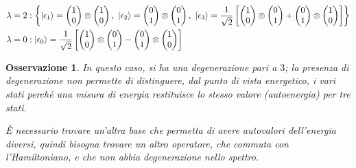 \documentclass[11pt, a4paper]{scrartcl} %
\numberwithin{equation}{subsection}
\theoremstyle{style2}
\newtheorem{osservazione}{Osservazione}[section]
\theoremstyle{style1}
\newenvironment{boxenv}[1][]{
    \begin{eqbox}[#1]
    }{
   \end{eqbox}
}
\begin{document}
\begin{equation}\label{auten1}
\begin{split}
	\lambda = 2&: \left\{\ket{\epsilon _1} = \begin{pmatrix} 1\\0\end{pmatrix} \otimes \begin{pmatrix} 1\\0 \end{pmatrix} ,\  \ket{\epsilon _2}= \begin{pmatrix} 0\\1 \end{pmatrix} \otimes \begin{pmatrix} 0\\1 \end{pmatrix} , \ \ket{\epsilon _3} = \frac{1}{\sqrt{2} }\left[ \begin{pmatrix} 1\\0 \end{pmatrix} \otimes \begin{pmatrix} 0\\1 \end{pmatrix} + \begin{pmatrix} 0\\1 \end{pmatrix} \otimes \begin{pmatrix} 1\\0 \end{pmatrix}  \right] \right\} \\
	\lambda =0&: \ket{\epsilon _0}=  \frac{1}{\sqrt{2} } \left[ \begin{pmatrix} 1\\0 \end{pmatrix} \otimes \begin{pmatrix} 0\\1 \end{pmatrix} - \begin{pmatrix} 0\\1 \end{pmatrix} \otimes \begin{pmatrix} 1\\0 \end{pmatrix}  \right]  
\end{split}
\end{equation}
\begin{boxenv}[]
\begin{osservazione}
In questo caso, si ha una degenerazione pari a $3$; la presenza di degenerazione non permette di distinguere, dal punto di vista energetico, i vari stati perch\'e una misura di energia restituisce lo stesso valore (autoenergia) per tre stati.

\`E necessario trovare un'altra base che permetta di avere autovalori dell'energia diversi, quindi bisogna trovare un altro operatore, che commuta con l'Hamiltoniano, e che non abbia degenerazione nello spettro.
\end{osservazione}
\end{boxenv}
\end{document}
